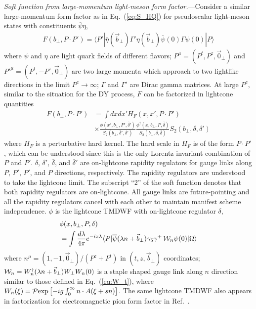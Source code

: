 \documentclass[twocolumn,aps,preprintnumbers,prd,superscriptaddress,10pt]{revtex4-1}
\begin{document}
{\it Soft function from large-momentum light-meson form factor.}---Consider a similar large-momentum form factor as in Eq.~(\ref{eq:S_HQ}) for pseudoscalar light-meson states with constituents $\overline\psi\eta$,
\begin{align}
F(b_\perp,P\!\cdot\!P')=\langle P'|\overline\eta(\vec b_\perp)\Gamma'\eta(\vec b_\perp) \overline\psi(0)\Gamma\psi(0)|P\rangle
\end{align}
where $\psi$ and $\eta$ are light quark fields of different flavors;
$P^\mu=(P^t,P^z,\vec 0_\perp)$ and $P'^\mu=(P^t,-P^z,\vec 0_\perp)$ are two large momenta which approach to two lightlike directions in the limit $P^z\to\infty$;
$\Gamma$ and $\Gamma'$ are Dirac gamma matrices.
%
At large $P^z$, similar to the situation for the DY process, $F$ can be factorized in lightcone
quantities~\cite{future}
\begin{align}\label{eq:F_factorization}
F(b_\perp,P\!\cdot\!P')&=\int dx dx' H_F(x,x',P\!\cdot\! P')\\
&\times\frac{\phi(x',b_\perp,P',\overline \delta')}{S_2(b_\perp,\overline \delta',\delta')} \frac{\phi^\dagger(x,b_\perp,P,\overline \delta)}{S_2(b_\perp,\delta,\overline \delta)} S_2(b_\perp,\delta,\delta')\nonumber
\end{align}
where $H_F$ is a perturbative hard kernel.
%
The hard scale in $H_F$ is of the form $P\!\cdot\! P'$, which can be understood since this is the only Lorentz invariant combination of $P$ and $P'$.
%
$\delta$, $\delta'$, $\overline \delta$, and $\overline \delta'$ are on-lightcone rapidity regulators for gauge links along $P$, $P'$, $P'$, and $P$ directions, respectively.
%
The rapidity regulators are understood to take the lightcone limit.
%
The subscript ``2'' of the soft function denotes that both rapidity regulators are on-lightcone.
%
All gauge links are future-pointing and all the rapidity regulators cancel with each other to maintain manifest scheme independence.
%
$\phi$ is the lightcone TMDWF with on-lightcone regulator $\delta$,
\begin{align}
&\phi(x,b_\perp,P,\delta)\nonumber\\
&=\int\frac{d\lambda}{4\pi}e^{-ix\lambda }\langle P|\overline\psi(\lambda n+\vec{b}_\perp)\gamma_5\gamma^+\,{\cal W}_n\psi(0)|\Omega\rangle
\end{align}
where $n^\mu=(1,-1,\vec 0_\perp)/(P^z+P^t)$ in $(t,z,\vec b_\perp)$ coordinates;
${\cal W}_n=W_n^{\dagger}(\lambda n+\vec{b}_\perp)W_\perp W_n(0)$ is a staple shaped gauge link along $n$ direction similar to those defined in Eq.~(\ref{eq:W_t}), where $W_n(\xi)={\cal P}{\rm exp} \left[-ig\int_{0}^{\infty} n\cdot A(\xi+sn)\right] $.
%
The same lightcone TMDWF also appears in factorization for electromagnetic pion form factor in Ref.~\cite{Li:1992nu}.
\end{document}

